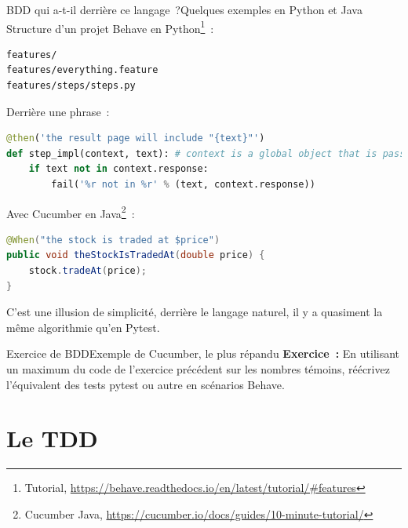 \documentclass{beamer}
\begin{document}
    \begin{frame}[fragile]{BDD qui a-t-il derrière ce langage~?}{Quelques exemples en Python et Java}
        \transdissolve
        Structure d'un projet Behave en Python\footnote{Tutorial, \url{https://behave.readthedocs.io/en/latest/tutorial/\#features}}~:
        \begin{lstlisting}[basicstyle=\ttfamily\tiny]
features/
features/everything.feature
features/steps/steps.py
        \end{lstlisting}
        Derrière une phrase~:
        \begin{lstlisting}[language=Python,basicstyle=\ttfamily\tiny]
@then('the result page will include "{text}"')
def step_impl(context, text): # context is a global object that is passed between all steps
    if text not in context.response:
        fail('%r not in %r' % (text, context.response))
        \end{lstlisting}
        Avec Cucumber en Java\footnote{Cucumber Java, \url{https://cucumber.io/docs/guides/10-minute-tutorial/}}~:
        \begin{lstlisting}[language=Java,basicstyle=\ttfamily\tiny]
@When("the stock is traded at $price")
public void theStockIsTradedAt(double price) {
    stock.tradeAt(price);
}
        \end{lstlisting}
        C'est une illusion de simplicité, derrière le langage naturel, il y a quasiment la même algorithmie qu'en Pytest.
    \end{frame}

    \begin{frame}{Exercice \execcounterdispinc{} de BDD}{Exemple de Cucumber, le plus répandu}
        \transdissolve
        \textbf{Exercice~:} En utilisant un maximum du code de l'exercice précédent sur les nombres témoins, réécrivez l'équivalent des tests pytest ou autre en scénarios Behave.
    \end{frame}


    \section{Le TDD}\label{sec:le-tdd}
\end{document}
